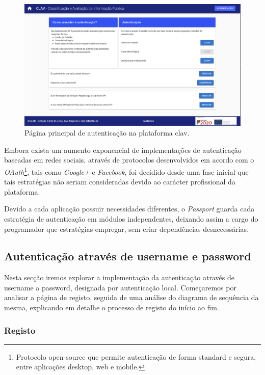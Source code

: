 \begin{figure}[h!]
    \centering
    \includegraphics[width=\textwidth]{img/clav/paginaAuth.png}
    \caption{Página principal de autenticação na plataforma \gls{clav}.}
    \label{fig:paginaAutenticacao}
\end{figure}

Embora exista um aumento exponencial de implementações de autenticação baseadas em redes sociais, através de protocolos desenvolvidos em acordo com o \emph{OAuth}\footnote{Protocolo open-source que permite autenticação de forma standard e segura, entre aplicações desktop, web e mobile.}, tais como \emph{Google+} e \emph{Facebook}, foi decidido desde uma fase inicial que tais estratégias não seriam consideradas devido ao carácter profissional da plataforma.

Devido a cada aplicação possuir necessidades diferentes, o \emph{Passport} guarda cada estratégia de autenticação em módulos independentes, deixando assim a cargo do programador que estratégias empregar, sem criar dependências desnecessárias.

\subsection{Autenticação através de username e password}

Nesta secção iremos explorar a implementação da autenticação através de username a password, designada por autenticação local. Começaremos por analisar a página de registo, seguida de uma análise do diagrama de sequência da mesma, explicando em detalhe o processo de registo do início ao fim.

\subsubsection{Registo}

